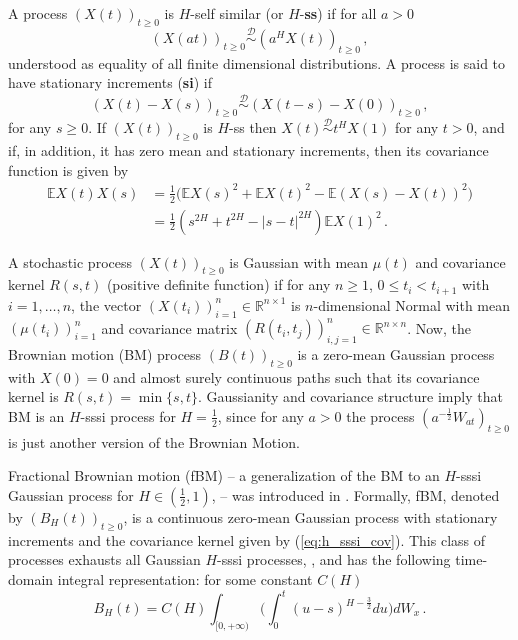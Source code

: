 \documentclass[a4paper]{article}
\newcommand{\Real}{\mathbb{R}}
\newcommand{\ex}{\mathbb{E}}
\newcommand{\Dcal}{\mathcal{D}}
\begin{document}
A process $(X(t))_{t\geq0}$ is $H$-self similar (or $H$-\textbf{ss}) if for all $a>0$
\begin{equation*} \label{eq:def_ss}
    (X(at))_{t\geq0} \overset{\Dcal}{\sim} (a^H X(t))_{t\geq0} \,,
\end{equation*}
understood as equality of all finite dimensional distributions. A process is said
to have stationary increments (\textbf{si}) if
\begin{equation*}\label{eq:def_si}
    (X(t)-X(s))_{t\geq0} \overset{\Dcal}{\sim} (X(t-s)-X(0))_{t\geq0} \,,
\end{equation*}
for any $s\geq 0$. If $(X(t))_{t\geq0}$ is $H$-ss then $X(t) \overset{\Dcal}{\sim} t^H X(1)$
for any $t>0$, and if, in addition, it has zero mean and stationary increments, then
its covariance function is given by
\begin{align}\label{eq:h_sssi_cov}
    \ex X(t) X(s)
        &= \frac{1}{2} \bigl(\ex X(s)^2 + \ex X(t)^2 - \ex(X(s) - X(t))^2 \bigr) \nonumber \\
        &= \frac{1}{2} (s^{2H}  + t^{2H} - |s-t|^{2H}) \ex X(1)^2 \,.
\end{align}

A stochastic process $(X(t))_{t\geq0}$ is Gaussian with mean $\mu(t)$ and covariance
kernel $R(s,t)$ (positive definite function) if for any $n\geq 1$, $0 \leq t_i < t_{i+1}$
with $i=1,\ldots,n$, the vector $(X(t_i))_{i=1}^n\in \Real^{n\times1}$ is $n$-dimensional
Normal with mean $(\mu(t_i))_{i=1}^n$ and covariance matrix $(R(t_i, t_j))_{i,j=1}^n\in \Real^{n\times n}$.
Now, the Brownian motion (BM) process $(B(t))_{t\geq0}$ is a zero-mean Gaussian process
with $X(0)=0$ and almost surely continuous paths such that its covariance kernel is
$R(s,t)=\min\{s, t\}$. Gaussianity and covariance structure imply that BM is an $H$-sssi
process for $H=\frac{1}{2}$, since for any $a>0$ the process $(a^{-\frac{1}{2}} W_{at})_{t\geq0}$
is just another version of the Brownian Motion.

Fractional Brownian motion (fBM) -- a generalization of the BM to an $H$-sssi Gaussian
process for $H \in (\frac{1}{2}, 1)$, -- was introduced in \cite{doi:10.1137/1010093}.
Formally, fBM, denoted by $(B_H(t))_{t\geq0}$, is a continuous zero-mean Gaussian
process with stationary increments and the covariance kernel given by (\ref{eq:h_sssi_cov}).
This class of processes exhausts all Gaussian $H$-sssi processes, \cite{embrechts2002},
and has the following time-domain integral representation: for some constant $C(H)$
\begin{equation}\label{eq:fbm_int_repr}
    B_H(t) = C(H) \int_{[0,+\infty)} \biggl(
            \int_0^t (u-s)^{H-\frac{3}{2}} du
        \biggr) dW_x \,.
\end{equation}
\end{document}
